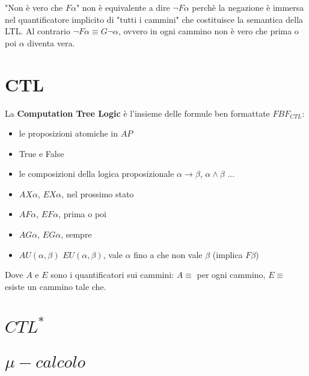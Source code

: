 "Non \`e vero che $F\alpha$" non \`e equivalente a dire $\neg F\alpha$ perch\`e la negazione \`e immersa nel quantificatore implicito di "tutti i cammini" che costituisce la semantica della LTL. Al contrario $\neg F\alpha \equiv G \neg \alpha$, ovvero in ogni cammino non \`e vero che prima o poi $\alpha$ diventa vera.

\section{CTL}

La \textbf{Computation Tree Logic} \`e l'insieme delle formule ben formattate $FBF_{CTL}$:
\begin{itemize}
    \item le proposizioni atomiche in $AP$
    \item True e False
    \item le composizioni della logica proposizionale $\alpha \rightarrow \beta$, $\alpha \land \beta$ ...
    \item $AX\alpha$, $EX\alpha$, nel prossimo stato
    \item $AF\alpha$, $EF\alpha$, prima o poi
    \item $AG\alpha$, $EG\alpha$, sempre
    \item $AU(\alpha, \beta)$ $EU(\alpha, \beta)$, vale $\alpha$ fino a che non vale $\beta$ (implica $F\beta$)
\end{itemize}

Dove $A$ e $E$ sono i quantificatori sui cammini: $A \equiv$ per ogni cammino, $E \equiv$ esiste un cammino tale che.

\section{$CTL^\ast$}

\section{$\mu-calcolo$}
